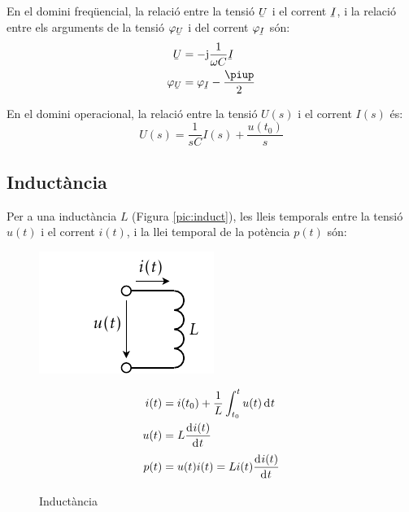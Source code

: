 En el domini freq\"{u}encial, la relaci\'{o} entre la tensi\'{o} $\cmplx{U}$ i el corrent $\cmplx{I}$, i la relaci\'{o} entre els arguments de la tensi\'{o} $\varphi_{\cmplx{U}}$ i del corrent $\varphi_{\cmplx{I}}$ s\'{o}n:
\begin{align}
   \cmplx{U} &= -\ju \frac{1}{\omega C} \cmplx{I} \\
   \varphi_{\cmplx{U}} &= \varphi_{\cmplx{I}} - \frac{\piup}{2}
\end{align}

En el domini operacional, la relaci\'{o} entre la tensi\'{o} $U(s)$ i el corrent $I(s)$ \'{e}s:
\begin{equation}
   U(s) = \frac{1}{s C} I(s) + \frac{u(t_0)}{s}
\end{equation}


\subsection{Induct\`{a}ncia} 

Per a una induct\`{a}ncia $L$ (Figura \vref{pic:induct}),
les lleis temporals entre la tensi\'{o} $u(t)$ i el corrent $i(t)$, i la llei temporal
de la pot\`{e}ncia $p(t)$ s\'{o}n:
\begin{figure}[htb]
\hfill
\begin{minipage}[b]{5cm}
    \includegraphics{Imatges/Cap-Fonaments-Inductancia.pdf}
\caption{Induct\`{a}ncia} \label{pic:induct}
\end{minipage}
\hfill
\begin{minipage}[b][3.8cm][t]{8cm}
   \begin{align}
      i(t) &= i(t_0) + \frac{1}{L} \int_{t_0}^t u(t) \diff t \\
      u(t) &= L \deriv{i(t)}{t} \\
      p(t) &= u(t) i(t) = L i(t) \deriv{i(t)}{t}
   \end{align}
\end{minipage}
\end{figure}

